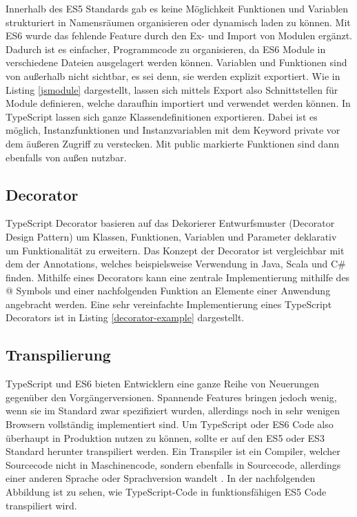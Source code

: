 Innerhalb des ES5 Standards gab es keine Möglichkeit Funktionen und Variablen strukturiert in Namensräumen organisieren oder dynamisch laden zu können.
Mit ES6 wurde das fehlende Feature durch den Ex- und Import von Modulen ergänzt. Dadurch ist es einfacher, Programmcode zu organisieren,
da ES6 Module in verschiedene Dateien ausgelagert werden können. Variablen und Funktionen sind von außerhalb nicht sichtbar, es sei denn, sie werden explizit exportiert.
Wie in Listing \ref{jsmodule} dargestellt, lassen sich mittels Export also Schnittstellen für Module definieren, welche daraufhin importiert und verwendet werden können.
In TypeScript lassen sich ganze Klassendefinitionen exportieren.
Dabei ist es möglich, Instanzfunktionen und Instanzvariablen mit dem Keyword private vor dem äußeren Zugriff zu verstecken.
Mit public markierte Funktionen sind dann ebenfalls von außen nutzbar.

\vspace{0.3cm}


\subsection{Decorator}

TypeScript Decorator basieren auf das Dekorierer Entwurfsmuster (Decorator Design Pattern) um Klassen,
Funktionen, Variablen und Parameter deklarativ um Funktionalität zu erweitern.
Das Konzept der Decorator ist vergleichbar mit dem der Annotations, welches beispielsweise Verwendung in Java, Scala und C\#
finden.
Mithilfe eines Decorators kann eine zentrale Implementierung
mithilfe des @ Symbols und einer nachfolgenden Funktion an Elemente einer Anwendung angebracht werden.
Eine sehr vereinfachte Implementierung eines TypeScript Decorators ist in Listing \ref{decorator-example} dargestellt.

\vspace{0.3cm}

\vspace{0.3cm}


\subsection{Transpilierung}

TypeScript und ES6 bieten Entwicklern eine ganze Reihe von Neuerungen gegenüber den Vorgängerversionen.
Spannende Features bringen jedoch wenig, wenn sie im Standard zwar spezifiziert wurden,
allerdings noch in sehr wenigen Browsern vollständig implementiert sind.
Um TypeScript oder ES6 Code also überhaupt in Produktion nutzen zu können, sollte er auf den ES5 oder ES3
Standard herunter transpiliert werden.
Ein Transpiler ist ein Compiler, welcher Sourcecode nicht in Maschinencode, sondern ebenfalls in Sourcecode,
allerdings einer anderen Sprache oder Sprachversion wandelt \cite{Introduction-to-the-Typescript-Transpiler}.
In der nachfolgenden Abbildung ist zu sehen, wie TypeScript-Code in funktionsfähigen ES5 Code transpiliert wird.


